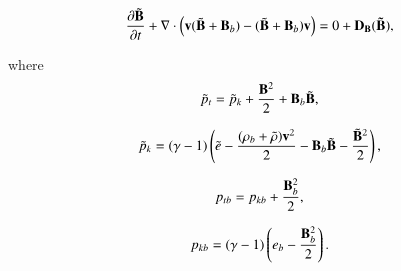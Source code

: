 \documentclass[final,1p]{elsarticle}
\begin{document}
\begin{equation}\label{eqpb}
{{\partial\tilde{{\bf B}}}\over{\partial t}} +\nabla \cdot\left(  {\bf v}(\tilde{ \bf B} + {\bf B}_b)-(\tilde{ \bf B} + {\bf B}_b){\bf v}\right)=0+\bf{D}_{B}(\tilde{\bf B}),
\end{equation}


where
\begin{equation}\label{eqppt}
\tilde{p}_{t}=\tilde{p}_{k}+{{{\bf B}^{2}}\over{2}}+{\bf B}_{b}\tilde{\bf B},
\end{equation}

\begin{equation}\label{eqppk}
\tilde{p}_{k}=(\gamma -1)\left(\tilde{e}-{{(\rho_{b}+\tilde{\rho}){\bf v}^2}\over{2}}-{\bf B}_{b}\tilde{\bf B}-{{\tilde{\bf B}^{2}}\over{2}}\right),
\end{equation}

\begin{equation}
p_{tb}=p_{kb}+{{{\bf B}_{b}^{2}}\over{2}},
\end{equation}

\begin{equation}\label{eqppkb}
p_{kb}=(\gamma -1)\left(e_{b}-{{{\bf B}_{b}^2}\over{2}}    \right).
\end{equation}
\end{document}
